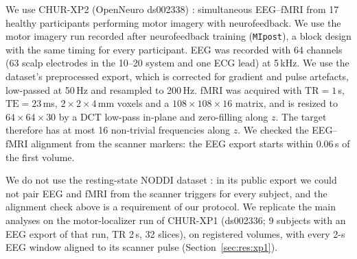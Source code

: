 We use CHUR-XP2 (OpenNeuro ds002338) \citep{lioi2019simultaneous}: simultaneous EEG--fMRI from 17 healthy participants performing motor imagery with neurofeedback. We use the motor imagery run recorded after neurofeedback training (\texttt{MIpost}), a block design with the same timing for every participant. EEG was recorded with 64 channels (63 scalp electrodes in the 10--20 system and one ECG lead) at 5\,kHz. We use the dataset's preprocessed export, which is corrected for gradient and pulse artefacts, low-passed at 50\,Hz and resampled to 200\,Hz. fMRI was acquired with $\mathrm{TR}=1$\,s, $\mathrm{TE}=23$\,ms, $2\times2\times4$\,mm voxels and a $108\times108\times16$ matrix, and is resized to $64\times64\times30$ by a DCT low-pass in-plane and zero-filling along $z$. The target therefore has at most 16 non-trivial frequencies along $z$. We checked the EEG--fMRI alignment from the scanner markers: the EEG export starts within 0.06\,s of the first volume.

We do not use the resting-state NODDI dataset \citep{deligianni2014relating}: in its public export we could not pair EEG and fMRI from the scanner triggers for every subject, and the alignment check above is a requirement of our protocol. We replicate the main analyses on the motor-localizer run of CHUR-XP1 (ds002336; 9 subjects with an EEG export of that run, TR 2\,s, 32 slices), on registered volumes, with every 2-s EEG window aligned to its scanner pulse (Section~\ref{sec:res:xp1}).
